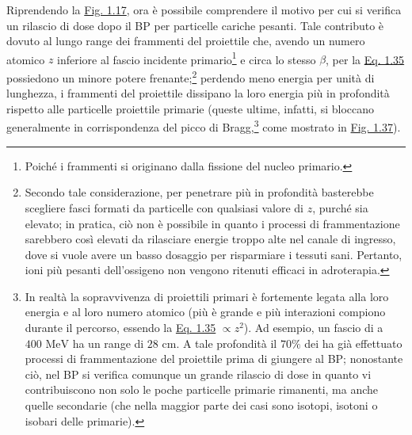 \documentclass[12pt,a4paper,twoside]{report}
\begin{document}
	Riprendendo la \hyperref[fig:photon]{Fig. 1.17}, ora è possibile comprendere il motivo per cui si verifica un rilascio di dose dopo il BP per particelle cariche pesanti. Tale contributo è dovuto al lungo range dei frammenti del proiettile che, avendo un numero atomico $z$ inferiore al fascio incidente primario\footnote{Poiché i frammenti si originano dalla fissione del nucleo primario.} e circa lo stesso $\beta$, per la \hyperref[eq:bethe_bloch]{Eq. 1.35} possiedono un minore potere frenante;\footnote{Secondo tale considerazione, per penetrare più in profondità basterebbe scegliere fasci formati da particelle con qualsiasi valore di $z$, purché sia elevato; in pratica, ciò non è possibile in quanto i processi di frammentazione sarebbero così elevati da rilasciare energie troppo alte nel canale di ingresso, dove si vuole avere un basso dosaggio per risparmiare i tessuti sani. Pertanto, ioni più pesanti dell'ossigeno non vengono ritenuti efficaci in adroterapia.} perdendo meno energia per unità di lunghezza, i frammenti del proiettile dissipano la loro energia più in profondità rispetto alle particelle proiettile primarie (queste ultime, infatti, si bloccano generalmente in corrispondenza del picco di Bragg,\footnote{In realtà la sopravvivenza di proiettili primari è fortemente legata alla loro energia e al loro numero atomico (più è grande e più interazioni compiono durante il percorso, essendo la \hyperref[eq:bethe_bloch]{Eq. 1.35} $\propto z^2$). Ad esempio, un fascio di  a $400\mbox{ MeV}$ ha un range di $28\mbox{ cm}$. A tale profondità il $70\%$ dei  ha già effettuato processi di frammentazione del proiettile prima di giungere al BP; nonostante ciò, nel BP si verifica comunque un grande rilascio di dose in quanto vi contribuiscono non solo le poche particelle primarie rimanenti, ma anche quelle secondarie (che nella maggior parte dei casi sono isotopi, isotoni o isobari delle primarie).} come mostrato in \hyperref[fig:late_release]{Fig. 1.37}).
\end{document}
